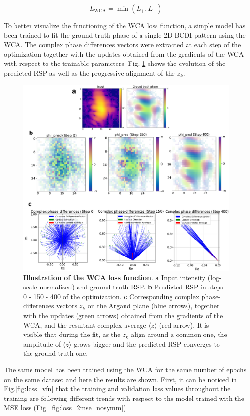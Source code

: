 \begin{equation}
    L_{\text{WCA}} = \min\left(L_+, L_-\right)
\label{eq:WCA_2}
\end{equation}

To better visualize the functioning of the WCA loss function, a simple model has been trained to fit the ground truth phase 
of a single 2D BCDI pattern using the WCA. The complex phase differences vectors were extracted at each step of the optimization 
together with the updates obtained from the gradients of the WCA with respect to the trainable parameters. Fig. \ref{fig:WCA} 
shows the evolution of the predicted RSP as well as the progressive alignment of the  $z_k$.
\begin{figure}[H]
    \centering
    \includegraphics[width=.8\textwidth]{figures/Phasing/WCA.pdf}
    \caption{\textbf{Illustration of the WCA loss function}. \textbf{a} Input intensity (log-scale normalized) and
    ground truth RSP. \textbf{b} Predicted RSP in steps 0 - 150 - 400 of the optimization. \textbf{c} Corresponding 
    complex phase-differences vectors $z_k$ on the Argand plane (blue arrows), together with the updates (green arrows) obtained 
    from the gradients of the WCA, and the resultant complex average $\langle z \rangle$ (red arrow). It is visible that 
    during the fit, as the $z_k$ align around a common one, the amplitude of $\langle z \rangle$ grows bigger and the predicted 
    RSP converges to the ground truth one.}
    \label{fig:WCA}
\end{figure}

The same model has been trained using the WCA for the same number of epochs on the same dataset and here the results are 
shown. First, it can be noticed in Fig.\ref{fig:loss_vfn} that the training and validation loss values throughout the 
training are following different trends with respect to the model trained with the MSE loss (Fig. \ref{fig:loss_2mse_nosymm})

